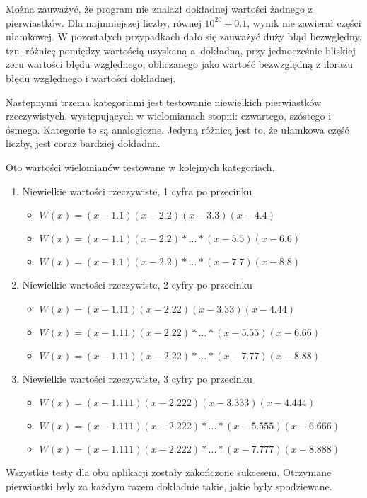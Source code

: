 Można zauważyć, że program nie znalazł dokładnej wartości żadnego z pierwiastków. Dla najmniejszej liczby, równej $10^{20}+0.1$, wynik nie zawierał części ułamkowej. W pozostałych przypadkach dało się zauważyć duży błąd bezwględny, tzn. różnicę pomiędzy wartością uzyskaną a~dokładną, przy jednocześnie bliskiej zeru wartości błędu względnego, obliczanego jako wartość bezwzględną z ilorazu błędu względnego i wartości dokładnej.

Następnymi trzema kategoriami jest testowanie niewielkich pierwiastków rzeczywistych, występujących w wielomianach stopni: czwartego, szóstego i ósmego. Kategorie te są analogiczne. Jedyną różnicą jest to, że ułamkowa część liczby, jest coraz bardziej dokładna.

Oto wartości wielomianów testowane w kolejnych kategoriach.

\begin{enumerate}
	\item Niewielkie wartości rzeczywiste, 1 cyfra po przecinku
	\begin{itemize}
		\item $W(x)=(x-1.1)(x-2.2)(x-3.3)(x-4.4)$
		\item $W(x)=(x-1.1)(x-2.2)*...*(x-5.5)(x-6.6)$
		\item $W(x)=(x-1.1)(x-2.2)*...*(x-7.7)(x-8.8)$
	\end{itemize}
	\item Niewielkie wartości rzeczywiste, 2 cyfry po przecinku
	\begin{itemize}
		\item $W(x)=(x-1.11)(x-2.22)(x-3.33)(x-4.44)$
		\item $W(x)=(x-1.11)(x-2.22)*...*(x-5.55)(x-6.66)$
		\item $W(x)=(x-1.11)(x-2.22)*...*(x-7.77)(x-8.88)$
	\end{itemize}
	\item Niewielkie wartości rzeczywiste, 3 cyfry po przecinku
	\begin{itemize}
		\item $W(x)=(x-1.111)(x-2.222)(x-3.333)(x-4.444)$
		\item $W(x)=(x-1.111)(x-2.222)*...*(x-5.555)(x-6.666)$
		\item $W(x)=(x-1.111)(x-2.222)*...*(x-7.777)(x-8.888)$
	\end{itemize}
\end{enumerate}

Wszystkie testy dla obu aplikacji zostały zakończone sukcesem. Otrzymane pierwiastki były za każdym razem dokładnie takie, jakie były spodziewane.

